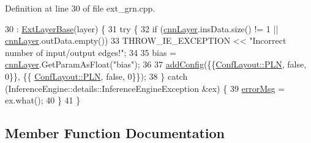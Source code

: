Definition at line 30 of file ext\+\_\+grn.\+cpp.


\begin{DoxyCode}
30                                            : \hyperlink{classInferenceEngine_1_1Extensions_1_1Cpu_1_1ExtLayerBase_affff0e8263ca26852ccf71d299d7b06a}{ExtLayerBase}(layer) \{
31         \textcolor{keywordflow}{try} \{
32             \textcolor{keywordflow}{if} (\hyperlink{classInferenceEngine_1_1Extensions_1_1Cpu_1_1ExtLayerBase_a1074cdccacb9e9ca6eec01bbc2f7ca4a}{cnnLayer}.insData.size() != 1 || \hyperlink{classInferenceEngine_1_1Extensions_1_1Cpu_1_1ExtLayerBase_a1074cdccacb9e9ca6eec01bbc2f7ca4a}{cnnLayer}.outData.empty())
33                 THROW\_IE\_EXCEPTION << \textcolor{stringliteral}{"Incorrect number of input/output edges!"};
34 
35             bias = \hyperlink{classInferenceEngine_1_1Extensions_1_1Cpu_1_1ExtLayerBase_a1074cdccacb9e9ca6eec01bbc2f7ca4a}{cnnLayer}.GetParamAsFloat(\textcolor{stringliteral}{"bias"});
36 
37             \hyperlink{classInferenceEngine_1_1Extensions_1_1Cpu_1_1ExtLayerBase_a0ac7a6632e95b9500d5246b05b4b0bfa}{addConfig}(\{\{\hyperlink{classInferenceEngine_1_1Extensions_1_1Cpu_1_1ExtLayerBase_a1258a8d209e0249e0b1717618352ddfba446687ea2db1ada75be5ed053be77f59}{ConfLayout::PLN}, \textcolor{keyword}{false}, 0\}\}, \{\{
      \hyperlink{classInferenceEngine_1_1Extensions_1_1Cpu_1_1ExtLayerBase_a1258a8d209e0249e0b1717618352ddfba446687ea2db1ada75be5ed053be77f59}{ConfLayout::PLN}, \textcolor{keyword}{false}, 0\}\});
38         \} \textcolor{keywordflow}{catch} (InferenceEngine::details::InferenceEngineException &ex) \{
39             \hyperlink{classInferenceEngine_1_1Extensions_1_1Cpu_1_1ExtLayerBase_abc78e9b5a79fa339ffd831a5318f71f7}{errorMsg} = ex.what();
40         \}
41     \}
\end{DoxyCode}


\subsection{Member Function Documentation}
